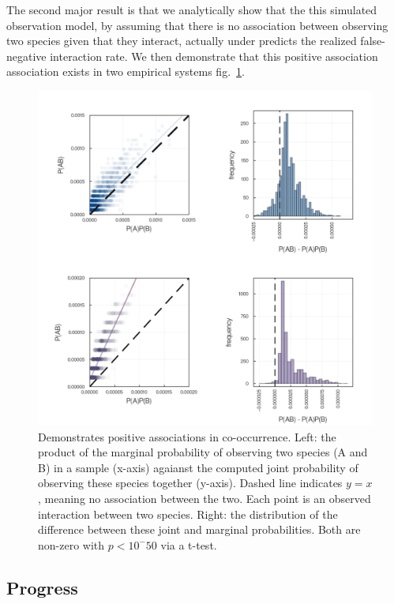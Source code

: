 \documentclass[11pt]{article}
\makeatletter
\def\maxwidth{\ifdim\Gin@nat@width>\linewidth\linewidth
\else\Gin@nat@width\fi}
\let\Oldincludegraphics\includegraphics
\renewcommand{\includegraphics}[1]{\Oldincludegraphics[width=\maxwidth]{#1}}
\makeatother
\begin{document}
The second major result is that we analytically show that the this
simulated observation model, by assuming that there is no association
between observing two species given that they interact, actually under
predicts the realized false-negative interaction rate. We then
demonstrate that this positive association association exists in two
empirical systems fig.~\ref{fig:posassoc}.

\begin{figure}
\hypertarget{fig:posassoc}{%
\centering
\includegraphics{./figures/positiveassociations.png}
\caption{Demonstrates positive associations in co-occurrence. Left: the
product of the marginal probability of observing two species (A and B)
in a sample (x-axis) agaianst the computed joint probability of
observing these species together (y-axis). Dashed line indicates
\(y=x\), meaning no association between the two. Each point is an
observed interaction between two species. Right: the distribution of the
difference between these joint and marginal probabilities. Both are
non-zero with \(p < 10^-50\) via a t-test.}\label{fig:posassoc}
}
\end{figure}

\hypertarget{progress}{%
\subsection{Progress}\label{progress}}
\end{document}
